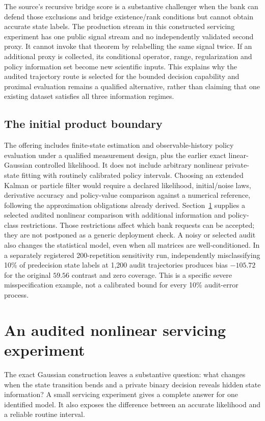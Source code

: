 The source's recursive bridge score is a substantive challenger when the
bank can defend those exclusions and bridge existence/rank conditions but
cannot obtain accurate state labels. The production stream in this constructed servicing experiment has one
public signal stream and no independently validated second proxy. It cannot
invoke that theorem by relabelling the same signal twice. If an additional
proxy is collected, its conditional operator, range, regularization and
policy information set become new scientific inputs. This explains why the
audited trajectory route is selected for the bounded decision capability
and proximal evaluation remains a qualified alternative, rather than
claiming that one existing dataset satisfies all three information regimes.

\subsection{The initial product boundary}
The offering includes finite-state estimation and observable-history policy
evaluation under a qualified measurement design, plus the earlier exact
linear-Gaussian controlled likelihood. It does not include arbitrary nonlinear
private-state fitting with routinely calibrated policy intervals. Choosing
an extended Kalman or particle filter would require a declared likelihood,
initial/noise laws, derivative accuracy and policy-value comparison against
a numerical reference, following the approximation obligations already
derived. Section~\ref{c7:nonlinear} supplies a selected audited nonlinear
comparison with additional information and policy-class restrictions.
Those restrictions affect which bank requests can be accepted; they are
not postponed as a generic deployment check. A noisy or selected audit
also changes the statistical model, even when all matrices are well-conditioned.
In a separately registered 200-repetition sensitivity run, independently
misclassifying 10\% of predecision state labels at 1,200 audit trajectories
produces bias $-105.72$ for the original $59.56$ contrast and zero coverage.
This is a specific severe misspecification example, not a calibrated bound
for every 10\% audit-error process.


\section{An audited nonlinear servicing experiment}
\label{c7:nonlinear}
The exact Gaussian construction leaves a substantive question: what changes
when the state transition bends and a private binary decision reveals hidden
state information? A small servicing experiment gives a complete answer for
one identified model. It also exposes the difference between an accurate
likelihood and a reliable routine interval.

